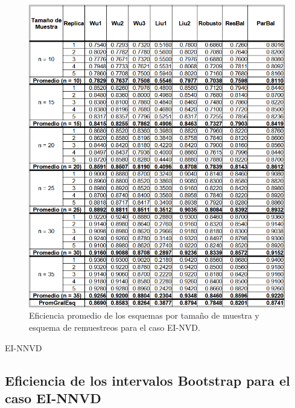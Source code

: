 \begin{figure}[ht] 
	\centering 
	\includegraphics[width=0.9\linewidth]{img/EI_NVD_Efic_Esq.png} 
	\caption{Eficiencia promedio de los esquemas por tamaño de muestra y esquema de remuestreos para el caso EI-NVD.} 
	\label{fig:EI_NVD_Esq}
\end{figure}

EI-NNVD
\subsection{Eficiencia de los intervalos Bootstrap para el caso EI-NNVD}

